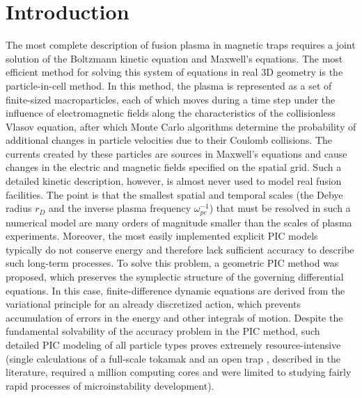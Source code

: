 \documentclass[final,3p]{elsarticle}
\begin{document}


\section{Introduction}

The most complete description of fusion plasma in magnetic traps requires a joint solution of the Boltzmann kinetic equation and Maxwell's equations. The most efficient method for solving this system of equations in real 3D geometry is the particle-in-cell method. In this method, the plasma is represented as a set of finite-sized macroparticles, each of which moves during a time step under the influence of electromagnetic fields along the characteristics of the collisionless Vlasov equation, after which Monte Carlo algorithms determine the probability of additional changes in particle velocities due to their Coulomb collisions. The currents created by these particles are sources in Maxwell's equations and cause changes in the electric and magnetic fields specified on the spatial grid. Such a detailed kinetic description, however, is almost never used to model real fusion facilities. The point is that the smallest spatial and temporal scales (the Debye radius $r_D$ and the inverse plasma frequency $\omega_{pe}^{-1}$) that must be resolved in such a numerical model are many orders of magnitude smaller than the scales of plasma experiments. Moreover, the most easily implemented explicit PIC models typically do not conserve energy and therefore lack sufficient accuracy to describe such long-term processes. To solve this problem, a geometric PIC method \cite{Squire2012,Xiao2015} was proposed, which preserves the symplectic structure of the governing differential equations. In this case, finite-difference dynamic equations are derived from the variational principle for an already discretized action, which prevents accumulation of errors in the energy and other integrals of motion. Despite the fundamental solvability of the accuracy problem in the PIC method, such detailed PIC modeling of all particle types proves extremely resource-intensive (single calculations of a full-scale tokamak \cite{Xiao2021,XIAO_2021} and an open trap \cite{Zheng2021}, described in the literature, required a million computing cores and were limited to studying fairly rapid processes of microinstability development).
\end{document}
